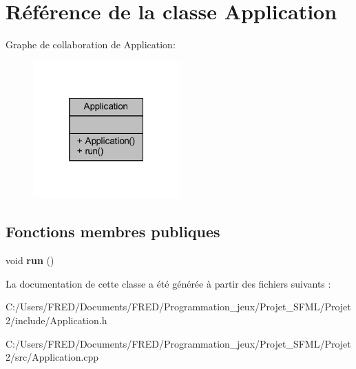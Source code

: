 \hypertarget{class_application}{}\section{Référence de la classe Application}
\label{class_application}


Graphe de collaboration de Application\+:\nopagebreak
\begin{figure}[H]
\begin{center}
\leavevmode
\includegraphics[width=160pt]{class_application__coll__graph}
\end{center}
\end{figure}
\subsection*{Fonctions membres publiques}
\begin{DoxyCompactItemize}
\item 
void {\bfseries run} ()\hypertarget{class_application_a68965449404743bf1add056784d6cf81}{}\label{class_application_a68965449404743bf1add056784d6cf81}

\end{DoxyCompactItemize}


La documentation de cette classe a été générée à partir des fichiers suivants \+:\begin{DoxyCompactItemize}
\item 
C\+:/\+Users/\+F\+R\+E\+D/\+Documents/\+F\+R\+E\+D/\+Programmation\+\_\+jeux/\+Projet\+\_\+\+S\+F\+M\+L/\+Projet2/include/Application.\+h\item 
C\+:/\+Users/\+F\+R\+E\+D/\+Documents/\+F\+R\+E\+D/\+Programmation\+\_\+jeux/\+Projet\+\_\+\+S\+F\+M\+L/\+Projet2/src/Application.\+cpp\end{DoxyCompactItemize}
